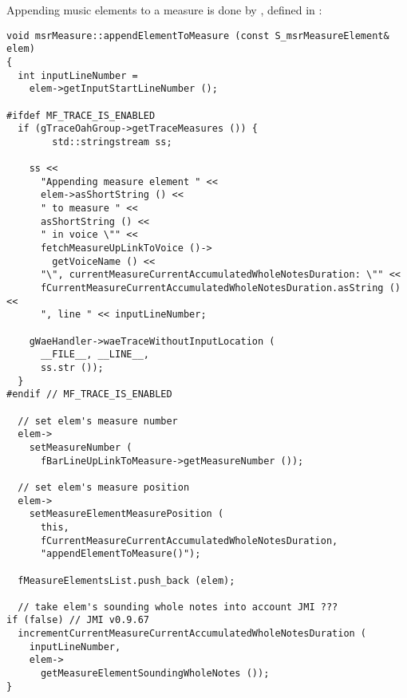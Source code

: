 Appending music elements to a measure is done by , defined in :%
\begin{lstlisting}[language=CPlusPlus]
void msrMeasure::appendElementToMeasure (const S_msrMeasureElement& elem)
{
  int inputLineNumber =
    elem->getInputStartLineNumber ();

#ifdef MF_TRACE_IS_ENABLED
  if (gTraceOahGroup->getTraceMeasures ()) {
		std::stringstream ss;

    ss <<
      "Appending measure element " <<
      elem->asShortString () <<
      " to measure " <<
      asShortString () <<
      " in voice \"" <<
      fetchMeasureUpLinkToVoice ()->
        getVoiceName () <<
      "\", currentMeasureCurrentAccumulatedWholeNotesDuration: \"" <<
      fCurrentMeasureCurrentAccumulatedWholeNotesDuration.asString () <<
      ", line " << inputLineNumber;

    gWaeHandler->waeTraceWithoutInputLocation (
      __FILE__, __LINE__,
      ss.str ());
  }
#endif // MF_TRACE_IS_ENABLED

  // set elem's measure number
  elem->
    setMeasureNumber (
      fBarLineUpLinkToMeasure->getMeasureNumber ());

  // set elem's measure position
  elem->
    setMeasureElementMeasurePosition (
      this,
      fCurrentMeasureCurrentAccumulatedWholeNotesDuration,
      "appendElementToMeasure()");

  fMeasureElementsList.push_back (elem);

  // take elem's sounding whole notes into account JMI ???
if (false) // JMI v0.9.67
  incrementCurrentMeasureCurrentAccumulatedWholeNotesDuration (
    inputLineNumber,
    elem->
      getMeasureElementSoundingWholeNotes ());
}
\end{lstlisting}

